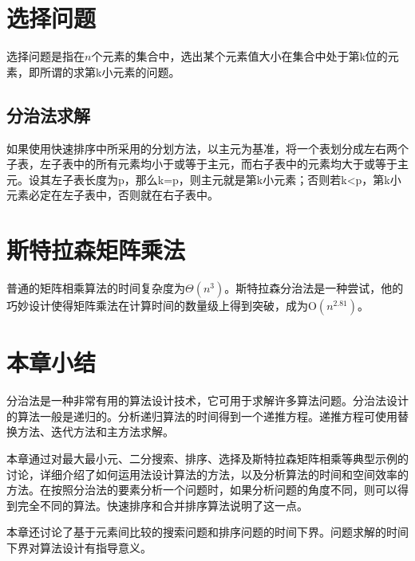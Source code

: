 \section{选择问题}
选择问题是指在$n$个元素的集合中，选出某个元素值大小在集合中处于第k位的元素，即所谓的求第k小元素的问题。

\subsection*{分治法求解}
如果使用快速排序中所采用的分划方法，以主元为基准，将一个表划分成左右两个子表，左子表中的所有元素均小于或等于主元，而右子表中的元素均大于或等于主元。设其左子表长度为p，那么k=p，则主元就是第k小元素；否则若k<p，第k小元素必定在左子表中，否则就在右子表中。
\section{斯特拉森矩阵乘法}
普通的矩阵相乘算法的时间复杂度为$\Theta (n^3)$。斯特拉森分治法是一种尝试，他的巧妙设计使得矩阵乘法在计算时间的数量级上得到突破，成为$\mathrm{O}(n^{2.81})$。
\section{本章小结}
分治法是一种非常有用的算法设计技术，它可用于求解许多算法问题。分治法设计的算法一般是递归的。分析递归算法的时间得到一个递推方程。递推方程可使用替换方法、迭代方法和主方法求解。

本章通过对最大最小元、二分搜索、排序、选择及斯特拉森矩阵相乘等典型示例的讨论，详细介绍了如何运用法设计算法的方法，以及分析算法的时间和空间效率的方法。在按照分治法的要素分析一个问题时，如果分析问题的角度不同，则可以得到完全不同的算法。快速排序和合并排序算法说明了这一点。

本章还讨论了基于元素间比较的搜索问题和排序问题的时间下界。问题求解的时间下界对算法设计有指导意义。